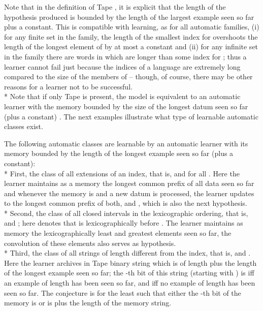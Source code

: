 \documentclass{LMCS}
\theoremstyle{plain}\newtheorem{athm}[thm]{Theorem}
\theoremstyle{plain}\newtheorem{aprop}[thm]{Proposition}
\theoremstyle{plain}\newtheorem{aprob}[thm]{Open Problem}
\theoremstyle{plain}\newtheorem{acor}[thm]{Corollary}
\theoremstyle{plain}\newtheorem{alem}[thm]{Lemma}
\theoremstyle{definition}\newtheorem{adefn}[thm]{Definition}
\theoremstyle{definition}\newtheorem{arem}[thm]{Remark}
\theoremstyle{plain}\newtheorem{aexmp}[thm]{Example}
\theoremstyle{plain}\newtheorem{aclm}[thm]{Claim}
\def\sp{\\*\indent}
\begin{document}
\noindent
Note that in the definition of Tape , it is explicit that the length of
the hypothesis produced is bounded by the length of the largest
example seen so far plus a constant. This is compatible with learning, as 
for all automatic families, (i) for any finite set  in the family,
the length of the smallest index  for  overshoots the length 
of the longest element of  by at most a constant
and (ii) for any infinite set  in the family
there are words in  which are longer than some index for ;
thus a learner cannot fail just because
the indices of a language  are extremely long compared
to the size of the members of  -- though, of course, there may be other
reasons for a learner not to be successful.
\sp
Note that if
only Tape  is present, the model is equivalent to an automatic learner
with the memory bounded by the size of the longest datum seen so
far (plus a constant) \cite{CJLOSS11,JLS09}. The next examples illustrate
what type of learnable automatic classes exist.

\begin{exa} \label{ex:autolearn}
The following automatic classes are learnable by an automatic learner
with its memory bounded by the length of the longest example seen so
far (plus a constant):
\sp
First, the class of all extensions of an index, that is,
 and 
for all . Here the learner maintains as a memory the longest
common prefix  of all data seen so far and whenever the memory is 
and a new datum  is processed, the learner updates  to the longest
common prefix of both,  and , which is also the next hypothesis.
\sp
Second, the class of all closed intervals in the
lexicographic ordering, that is,  and ; here  denotes that
  is lexicographically before .
The learner maintains as memory
the lexicographically least and greatest elements seen so far, the convolution
of these elements also serves as hypothesis.
\sp
Third, the class of all strings of
length different from the index, that is,  and
. Here the learner archives in
Tape  binary string which is of length  plus the length of
the longest example
seen so far; the -th bit of this string (starting with )
is  iff an example
of length  has been seen so far, and  iff no example
of length  has been seen so far. The conjecture is  for the least
 such that either the -th bit of the memory is  or  is  plus
the length of the memory string.
\end{exa}
\end{document}
